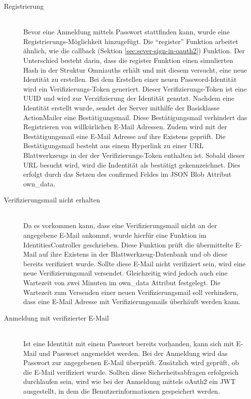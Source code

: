 \begin{description}
	\item[Registrierung]\hfill\\
	Bevor eine Anmeldung mittels Passwort stattfinden kann, wurde eine Registrierungs-Möglichkeit hinzugefügt. Die \enquote{register} Funktion arbeitet ähnlich, wie die callback (Sektion \ref{sec:sever-sign-in-oauth2}) Funktion. Der Unterschied besteht darin, dass die register Funktion einen simulierten Hash in der Struktur Omniauths erhält und mit diesem versucht, eine neue Identität zu erstellen. Bei dem Erstellen einer neuen Password-Identität wird ein Verifizierungs-Token generiert. Dieser Verifizierungs-Token ist eine \gls{UUID} und wird zur Verzifizierung der Identität genutzt. Nachdem eine Identität erstellt wurde, sendet der Server mithilfe der Basisklasse ActionMailer eine Bestätigungsmail. Diese Bestätigungsmail verhindert das Registrieren von willkürlichen E-Mail Adressen. Zudem wird  mit der Bestätigungsmail eine E-Mail Adresse auf ihre Existens geprüft. Die Bestätigungsmail besteht aus einem Hyperlink zu einer \gls{URL} Blattwerkzeugs in der der Verifizierungs-Token enthalten ist. Sobald dieser \gls{URL} besucht wird, wird die Indentität als bestätigt gekennzeichnet. Dies erfolgt durch das Setzen des confirmed Feldes im JSON Blob Attribut own\_data.
	
	\item[Verifizierungsmail nicht erhalten]\hfill\\
	Da es vorkommen kann, dass eine Verifizierungsmail nicht an der angegebene E-Mail ankommt, wurde hierfür eine Funktion im IdentitiesController geschrieben. Diese Funktion prüft die übermittelte E-Mail auf ihre Existens in der Blattwerkzeug-Datenbank und ob diese bereits verifiziert wurde. Sollte diese E-Mail nicht verifiziert sein, wird eine neue Verifizierungsmail versendet. Gleichzeitig wird jedoch auch eine Wartezeit von zwei Minuten im own\_data Attribut festgelegt. Die Wartezeit zum Versenden einer neuen Verifizierungsmail soll verhindern, dass eine E-Mail Adresse mit Verifizierungsmails überhäuft werden kann.
	
	\item[Anmeldung mit verifizierter E-Mail]\hfill\\
	Ist eine Identität mit einem Passwort bereits vorhanden, kann sich mit E-Mail und Passwort angemeldet werden. Bei der Anmeldung wird das Passwort zur angegebenen E-Mail überprüft. Zusätzlich wird geprüft, ob die E-Mail verifiziert wurde. Sollten diese Sicherheitsabfragen erfolgreich durchlaufen sein, wird wie bei der Anmeldung mittels \gls{oAuth2} ein \gls{JWT} ausgestellt, in dem die Benutzerinformationen gespeichert werden.
	

\end{description}
